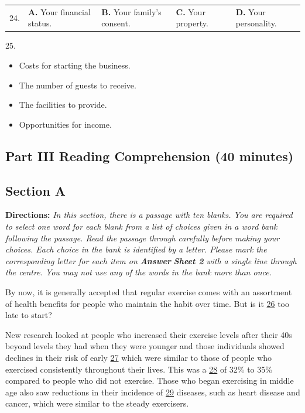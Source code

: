 \documentclass[UTF8,11pt]{ctexart}
\begin{document}
\noindent\begin{tabularx}{\linewidth}{@{}lXXXX@{}}24. & \textbf{A.} Your financial status. & \textbf{B.} Your family’s consent. & \textbf{C.} Your property. & \textbf{D.} Your personality.\\\end{tabularx}\par

25.


\begin{itemize}[leftmargin=2em,itemsep=.2em,topsep=.4em]\item[A.] Costs for starting the business.
\item[B.] The number of guests to receive.
\item[C.] The facilities to provide.
\item[D.] Opportunities for income.
\end{itemize}

\subsection*{\textbf{Part III Reading Comprehension (40 minutes)}}


\subsection*{\textbf{Section A}}


\textbf{Directions:} \textit{In this section, there is a passage with ten blanks. You are required to select one word for each blank from a} \textit{list of choices given in a word bank following the passage. Read the passage through carefully before making your} \textit{choices. Each choice in the bank is identified by a letter. Please mark the corresponding letter for each item on }\textbf{\textit{Answer}} \textbf{\textit{Sheet 2}}\textit{ with a single line through the centre. You may not use any of the words in the bank more than once.}


By now, it is generally accepted that regular exercise comes with an assortment of health benefits for people who maintain the habit over time. But is it \uline{26} too late to start?


New research looked at people who increased their exercise levels after their 40s beyond levels they had when they were younger and those individuals showed declines in their risk of early \uline{27} which were similar to those of people who exercised consistently throughout their lives. This was a \uline{28} of 32\% to 35\% compared to people who did not exercise. Those who began exercising in middle age also saw reductions in their incidence of \uline{29} diseases, such as heart disease and cancer, which were similar to the steady exercisers.
\end{document}
